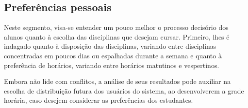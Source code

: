 \begin{apendicesenv}
  \section*{Preferências pessoais} \label{sec:Preferências pessoais}

  Neste segmento, visa-se entender um pouco melhor o processo decisório dos alunos quanto à escolha das disciplinas que desejam cursar. Primeiro, lhes é indagado quanto à disposição das disciplinas, variando entre disciplinas concentradas em poucos dias ou espalhadas durante a semana e quanto à preferência de horários, variando entre horários matutinos e vespertinos.

  Embora não lide com conflitos, a análise de seus resultados pode auxiliar na escolha de distribuição futura dos usuários do sistema, ao desenvolverem a grade horária, caso desejem considerar as preferências dos estudantes.

\end{apendicesenv}
